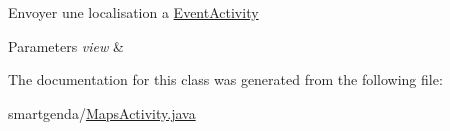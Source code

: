 Envoyer une localisation a \hyperlink{classcom_1_1agenda_1_1ter_1_1smartgenda_1_1_event_activity}{Event\-Activity} 
\begin{DoxyParams}{Parameters}
{\em view} & \\
\hline
\end{DoxyParams}


The documentation for this class was generated from the following file\-:\begin{DoxyCompactItemize}
\item 
smartgenda/\hyperlink{_maps_activity_8java}{Maps\-Activity.\-java}\end{DoxyCompactItemize}
